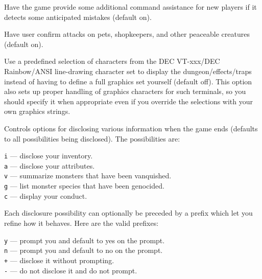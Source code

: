 \item[\ib{cmdassist}]
Have the game provide some additional command assistance for new 
players if it detects some anticipated mistakes (default on).
\item[\ib{confirm}]
Have user confirm attacks on pets, shopkeepers, and other
peaceable creatures (default on).
\item[\ib{DECgraphics}]
Use a predefined selection of characters from the DEC VT-xxx/DEC
Rainbow/ANSI line-drawing character set to display the dungeon/effects/traps
instead of having to define a full graphics set yourself (default off).
This option also sets up proper handling of graphics
characters for such terminals, so you should specify it when appropriate
even if you override the selections with your own graphics strings.
\item[\ib{disclose}]
Controls options for disclosing various information when the game ends (defaults
to all possibilities being disclosed).
The possibilities are:

{\tt i} --- disclose your inventory.\\
{\tt a} --- disclose your attributes.\\
{\tt v} --- summarize monsters that have been vanquished.\\
{\tt g} --- list monster species that have been genocided.\\
{\tt c} --- display your conduct.

Each disclosure possibility can optionally be preceded by a prefix which
let you refine how it behaves. Here are the valid prefixes:

{\tt y} --- prompt you and default to yes on the prompt.\\
{\tt n} --- prompt you and default to no on the prompt.\\
{\tt +} --- disclose it without prompting.\\
{\tt -} --- do not disclose it and do not prompt.

